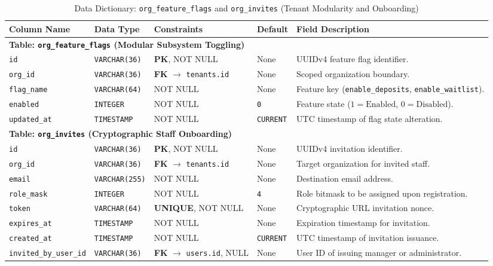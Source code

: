 \begin{table}[htbp]
\centering
\caption{Data Dictionary: \texttt{org\_feature\_flags} and \texttt{org\_invites} (Tenant Modularity and Onboarding)}
\label{tab:dict_gov_misc}
\small
\begin{tabularx}{\textwidth}{llp{3.2cm}lX}
\toprule
\textbf{Column Name} & \textbf{Data Type} & \textbf{Constraints} & \textbf{Default} & \textbf{Field Description} \\
\midrule
\multicolumn{5}{l}{\textbf{Table: \texttt{org\_feature\_flags} (Modular Subsystem Toggling)}} \\
\texttt{id} & \texttt{VARCHAR(36)} & \textbf{PK}, NOT NULL & None & UUIDv4 feature flag identifier. \\
\texttt{org\_id} & \texttt{VARCHAR(36)} & \textbf{FK} $\to$ \texttt{tenants.id} & None & Scoped organization boundary. \\
\texttt{flag\_name} & \texttt{VARCHAR(64)} & NOT NULL & None & Feature key (\texttt{enable\_deposits}, \texttt{enable\_waitlist}). \\
\texttt{enabled} & \texttt{INTEGER} & NOT NULL & \texttt{0} & Feature state ($1 = \text{Enabled}$, $0 = \text{Disabled}$). \\
\texttt{updated\_at} & \texttt{TIMESTAMP} & NOT NULL & \texttt{CURRENT} & UTC timestamp of flag state alteration. \\
\midrule
\multicolumn{5}{l}{\textbf{Table: \texttt{org\_invites} (Cryptographic Staff Onboarding)}} \\
\texttt{id} & \texttt{VARCHAR(36)} & \textbf{PK}, NOT NULL & None & UUIDv4 invitation identifier. \\
\texttt{org\_id} & \texttt{VARCHAR(36)} & \textbf{FK} $\to$ \texttt{tenants.id} & None & Target organization for invited staff. \\
\texttt{email} & \texttt{VARCHAR(255)} & NOT NULL & None & Destination email address. \\
\texttt{role\_mask} & \texttt{INTEGER} & NOT NULL & \texttt{4} & Role bitmask to be assigned upon registration. \\
\texttt{token} & \texttt{VARCHAR(64)} & \textbf{UNIQUE}, NOT NULL & None & Cryptographic URL invitation nonce. \\
\texttt{expires\_at} & \texttt{TIMESTAMP} & NOT NULL & None & Expiration timestamp for invitation. \\
\texttt{created\_at} & \texttt{TIMESTAMP} & NOT NULL & \texttt{CURRENT} & UTC timestamp of invitation issuance. \\
\texttt{invited\_by\_user\_id} & \texttt{VARCHAR(36)} & \textbf{FK} $\to$ \texttt{users.id}, NULL & None & User ID of issuing manager or administrator. \\
\bottomrule
\end{tabularx}
\end{table}


